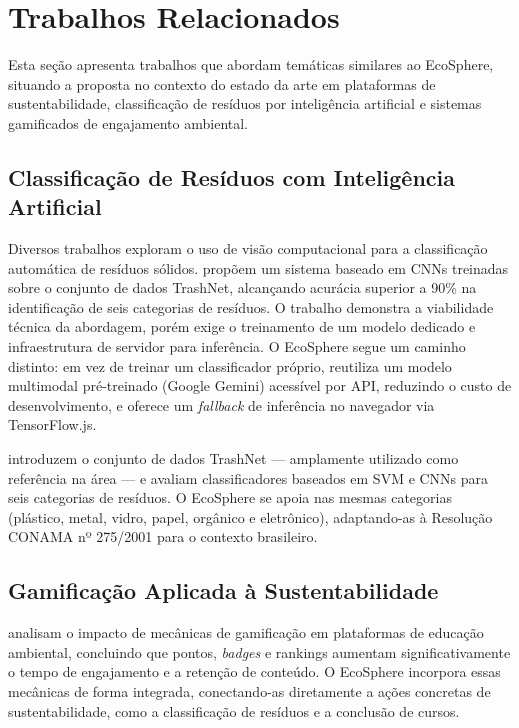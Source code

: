 \documentclass[
	12pt,
	openright,
	oneside,
	a4paper,
	chapter=TITLE,
	section=TITLE,
	subsection=TITLE,
	subsubsection=TITLE,
	english,
	brazil
	]{abntex2}
\begin{document}
\section{Trabalhos Relacionados}

Esta seção apresenta trabalhos que abordam temáticas similares ao EcoSphere, situando a proposta no contexto do estado da arte em plataformas de sustentabilidade, classificação de resíduos por inteligência artificial e sistemas gamificados de engajamento ambiental.

\subsection{Classificação de Resíduos com Inteligência Artificial}

Diversos trabalhos exploram o uso de visão computacional para a classificação automática de resíduos sólidos.  propõem um sistema baseado em CNNs treinadas sobre o conjunto de dados TrashNet, alcançando acurácia superior a 90\% na identificação de seis categorias de resíduos. O trabalho demonstra a viabilidade técnica da abordagem, porém exige o treinamento de um modelo dedicado e infraestrutura de servidor para inferência. O EcoSphere segue um caminho distinto: em vez de treinar um classificador próprio, reutiliza um modelo multimodal pré-treinado (Google Gemini) acessível por API, reduzindo o custo de desenvolvimento, e oferece um \textit{fallback} de inferência no navegador via TensorFlow.js.

 introduzem o conjunto de dados TrashNet — amplamente utilizado como referência na área — e avaliam classificadores baseados em SVM e CNNs para seis categorias de resíduos. O EcoSphere se apoia nas mesmas categorias (plástico, metal, vidro, papel, orgânico e eletrônico), adaptando-as à Resolução CONAMA nº 275/2001 para o contexto brasileiro.

\subsection{Gamificação Aplicada à Sustentabilidade}

 analisam o impacto de mecânicas de gamificação em plataformas de educação ambiental, concluindo que pontos, \textit{badges} e rankings aumentam significativamente o tempo de engajamento e a retenção de conteúdo. O EcoSphere incorpora essas mecânicas de forma integrada, conectando-as diretamente a ações concretas de sustentabilidade, como a classificação de resíduos e a conclusão de cursos.
\end{document}
